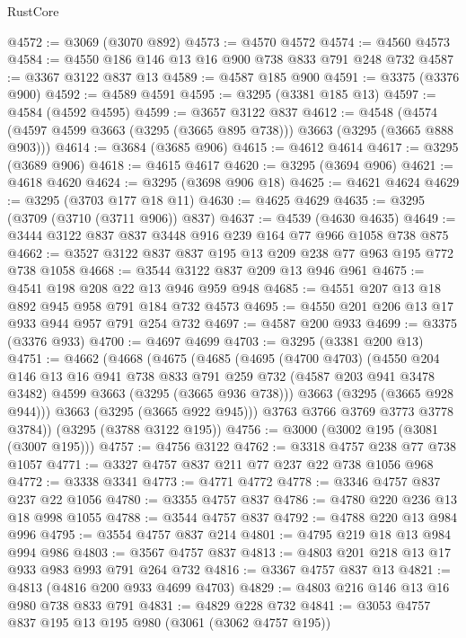 \begin{lexlean}{RustCore}
\begin{coremodule}
@4572 := @3069 (@3070 @892)
@4573 := @4570 @4572
@4574 := @4560 @4573
@4584 := @4550 @186 @146 @13 @16 @900 @738 @833 @791 @248 @732
@4587 := @3367 @3122 @837 @13
@4589 := @4587 @185 @900
@4591 := @3375 (@3376 @900)
@4592 := @4589 @4591
@4595 := @3295 (@3381 @185 @13)
@4597 := @4584 (@4592 @4595)
@4599 := @3657 @3122 @837
@4612 := @4548 (@4574 (@4597 @4599 @3663 (@3295 (@3665 @895 @738))) @3663 (@3295 (@3665 @888 @903)))
@4614 := @3684 (@3685 @906)
@4615 := @4612 @4614
@4617 := @3295 (@3689 @906)
@4618 := @4615 @4617
@4620 := @3295 (@3694 @906)
@4621 := @4618 @4620
@4624 := @3295 (@3698 @906 @18)
@4625 := @4621 @4624
@4629 := @3295 (@3703 @177 @18 @11)
@4630 := @4625 @4629
@4635 := @3295 (@3709 (@3710 (@3711 @906)) @837)
@4637 := @4539 (@4630 @4635)
@4649 := @3444 @3122 @837 @837 @3448 @916 @239 @164 @77 @966 @1058 @738 @875
@4662 := @3527 @3122 @837 @837 @195 @13 @209 @238 @77 @963 @195 @772 @738 @1058
@4668 := @3544 @3122 @837 @209 @13 @946 @961
@4675 := @4541 @198 @208 @22 @13 @946 @959 @948
@4685 := @4551 @207 @13 @18 @892 @945 @958 @791 @184 @732 @4573
@4695 := @4550 @201 @206 @13 @17 @933 @944 @957 @791 @254 @732
@4697 := @4587 @200 @933
@4699 := @3375 (@3376 @933)
@4700 := @4697 @4699
@4703 := @3295 (@3381 @200 @13)
@4751 := @4662
    (@4668
      (@4675
        (@4685
          (@4695
            (@4700 @4703)
            (@4550
              @204
              @146
              @13
              @16
              @941
              @738
              @833
              @791
              @259
              @732
              (@4587 @203 @941 @3478 @3482)
              @4599
              @3663
              (@3295 (@3665 @936 @738)))
            @3663
            (@3295 (@3665 @928 @944)))
          @3663
          (@3295 (@3665 @922 @945)))
        @3763
        @3766
        @3769
        @3773
        @3778
        @3784))
    (@3295 (@3788 @3122 @195))
@4756 := @3000 (@3002 @195 (@3081 (@3007 @195)))
@4757 := @4756 @3122
@4762 := @3318 @4757 @238 @77 @738 @1057
@4771 := @3327 @4757 @837 @211 @77 @237 @22 @738 @1056 @968
@4772 := @3338 @3341
@4773 := @4771 @4772
@4778 := @3346 @4757 @837 @237 @22 @1056
@4780 := @3355 @4757 @837
@4786 := @4780 @220 @236 @13 @18 @998 @1055
@4788 := @3544 @4757 @837
@4792 := @4788 @220 @13 @984 @996
@4795 := @3554 @4757 @837 @214
@4801 := @4795 @219 @18 @13 @984 @994 @986
@4803 := @3567 @4757 @837
@4813 := @4803 @201 @218 @13 @17 @933 @983 @993 @791 @264 @732
@4816 := @3367 @4757 @837 @13
@4821 := @4813 (@4816 @200 @933 @4699 @4703)
@4829 := @4803 @216 @146 @13 @16 @980 @738 @833 @791
@4831 := @4829 @228 @732
@4841 := @3053 @4757 @837 @195 @13 @195 @980 (@3061 (@3062 @4757 @195))

\end{coremodule}
\end{lexlean}
